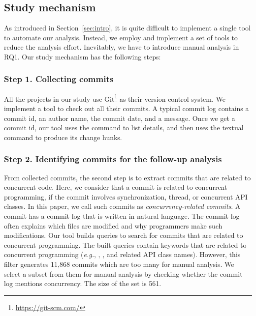 \subsection{Study mechanism}
\label{sec:method:tool}
As introduced in Section~\ref{sec:intro}, it is quite difficult to implement a single tool to automate our analysis. Instead, we employ and implement a set of tools to reduce the analysis effort. Inevitably, we have to introduce manual analysis in RQ1. Our study mechanism has the following steps:

\subsubsection{Step 1. Collecting commits} All the projects in our study use Git\footnote{\url{https://git-scm.com/}} as their version control system. We implement a tool to check out all their commits. A typical commit log contains a commit id, an author name, the commit date, and a message. Once we get a commit id, our tool uses the  command to list details, and then uses the textual  command to produce its change hunks.

\subsubsection{Step 2. Identifying commits for the follow-up analysis} From collected commits, the second step is to extract commits that are related to concurrent code. Here, we consider that a commit is related to concurrent programming, if the commit involves synchronization, thread, or concurrent API classes. In this paper, we call such commits as \emph{concurrency-related commits}. A commit has a commit log that is written in natural language. The commit log often explains which files are modified and why programmers make such modifications. Our tool builds queries to search for commits that are related to concurrent programming. The built queries contain keywords that are related to concurrent programming (\emph{e.g.}, , , and related API class names). However, this filter generates 11,868 commits which are too many for manual analysis. We select a subset from them for manual analysis by checking whether the commit log mentions concurrency. The size of the set is 561.

